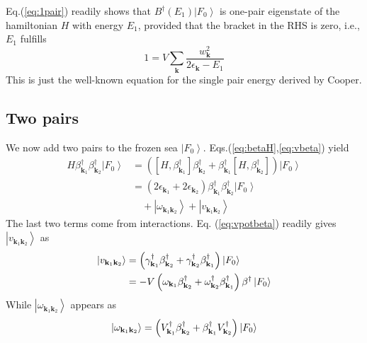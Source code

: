 \documentclass[aps,prb,superscriptaddress,showpacs,reprint,lengthcheck]{revtex4-1}
\newcommand{\vk}{\ensuremath{\mathbf{k}}}
\begin{document}
Eq.(\ref{eq:1pair}) readily shows that  $B^{\dagger}(%
E _1)\left|F_0\right> $ is  one-pair eigenstate of the hamiltonian $H$ with energy  $%
E _1$, provided that the bracket in the RHS is zero, i.e., $E_1$  fulfills
\begin{equation}  \label{eq:SchOne}
1=V\sum_\vk{\frac{w_\vk^2}{2\epsilon_\vk-E _1}}
\end{equation}
This is just the well-known equation for the single pair energy
derived by Cooper.

\subsection{Two pairs}

We now add two pairs to the frozen sea $\left|F_0\right>$. Eqs.(\ref{eq:betaH},\ref{eq:vbeta}) yield 
\begin{equation}  \label{eq:SchTwo}
\begin{split}
H\beta^{\dagger}_{\mathbf{k} _1}\beta^{\dagger}_{\mathbf{k}
_2}\left|F_0\right>   &=\left(\left[H,\beta^{\dagger}_{\mathbf{k} _1}\right]
\beta^{\dagger}_{\mathbf{k} _2}+\beta^{\dagger}_{\mathbf{k} _1}\left[%
H,\beta^{\dagger}_{\mathbf{k} _2}\right]  \right) \left|F_0\right>   \\
&=\left(2\epsilon_{\mathbf{k} _1}+2\epsilon_{\mathbf{k} _2}\right)
\beta^{\dagger}_{\mathbf{k} _1}\beta^{\dagger}_{\mathbf{k}
_2}\left|F_0\right>\\
&\quad  +\left|\omega_{\mathbf{k} _1\mathbf{k} _2}\right>  +\left|v_{\mathbf{k} _1\mathbf{k} _2}\right> 
\end{split}%
\end{equation}
The last two terms come from interactions. Eq. (\ref{eq:vpotbeta}) readily gives $\left|v_{\mathbf{k} _1\mathbf{k} _2}\right> $ as 
\begin{equation}
\begin{split}
\left|v_{\mathbf{k} _1\mathbf{k} _2}\right>& =\left(\gamma^{\dagger}_{\mathbf{%
k} _1}\beta^{\dagger}_{\mathbf{k} _2}+\gamma^{\dagger}_{\mathbf{k}
_2}\beta^{\dagger}_{\mathbf{k} _1}\right) \left|F_0\right> \\
&=-V\left(\omega_{\mathbf{k} _1}\beta^{\dagger}_{\mathbf{k} _2}+\omega^{\dagger}_{\mathbf{k}
_2}\beta^{\dagger}_{\mathbf{k} _1}\right)\beta^\dagger \left|F_0\right>  
\end{split}
\end{equation}
While  $\left|\omega_{\mathbf{k} _1\mathbf{k} _2}\right> $ appears as 
\begin{equation}
\left|\omega_{\mathbf{k} _1\mathbf{k} _2}\right> =\left(V^{\dagger}_{\mathbf{%
k} _1}\beta^{\dagger}_{\mathbf{k} _2}+\beta^{\dagger}_{\mathbf{k}
_1}V^{\dagger}_{\mathbf{k} _2}\right) \left|F_0\right> 
\end{equation}
\end{document}
